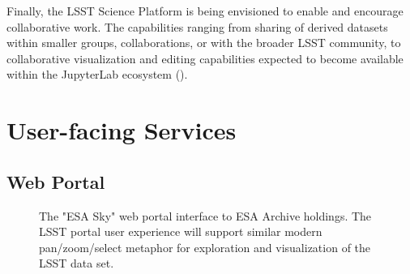 \documentclass[DM,lsstdraft,toc]{lsstdoc}
\begin{document}
Finally, the LSST Science Platform is being envisioned to enable and encourage
collaborative work.  The capabilities ranging from sharing of derived
datasets within smaller groups, collaborations, or with the broader LSST
community, to collaborative visualization and editing capabilities expected
to become available within the JupyterLab ecosystem ().

\section{User-facing Services}

\subsection{Web Portal\label{sec:portal}}

\begin{figure}
	\centering
	\caption{The "ESA Sky" web portal interface to ESA Archive holdings. The LSST portal user
		experience will support similar modern pan/zoom/select metaphor for exploration and visualization of the LSST data set.
		\label{fig:portalESA}}
\end{figure}
\end{document}
